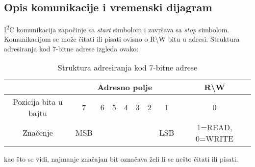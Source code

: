 \subsection{Opis komunikacije i vremenski dijagram}
I\textsuperscript{2}C komunikacija započinje sa \textit{start} simbolom i završava sa \textit{stop} simbolom. Komunikacijom se može čitati ili pisati ovisno o R\textbackslash W bitu u adresi. Struktura adresiranja kod 7-bitne adrese izgleda ovako:
\begin{center}
	\begin{table}
		\begin{tabular}{ | c | c | c | c | c | c | c | c | c | }
			\hline
			& \multicolumn{7}{|c|}{Adresno polje} & R\textbackslash W \\
			\hline
			Pozicija bita u bajtu & 7 & 6 & 5 & 4 & 3 & 2 & 1 & 0 \\
			\hline
			Značenje & MSB & \multicolumn{5}{|c|}{} & LSB & 1=READ, 0=WRITE \\
			\hline
		\end{tabular}
		\caption{Struktura adresiranja kod 7-bitne adrese \cite{i2c_wikipedia}}
	\end{table}
\end{center}
kao što se vidi, najmanje značajan bit označava želi li se nešto čitati ili pisati.

